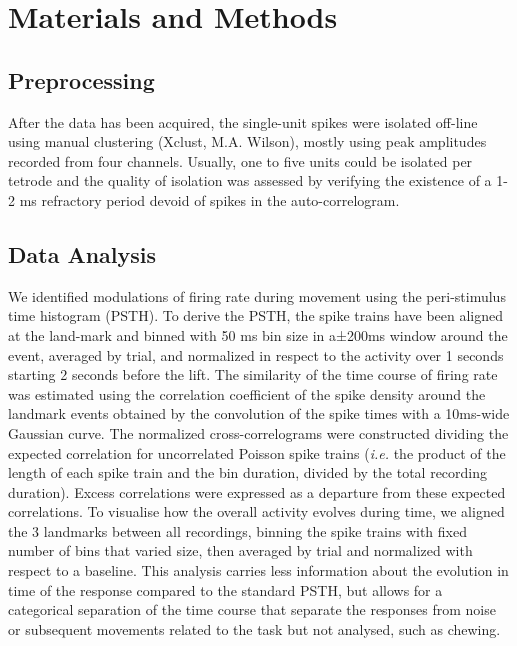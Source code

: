 \section{Materials and Methods}

\subsection{Preprocessing}
After the data has been acquired, the single-unit spikes were isolated off-line using manual clustering (Xclust, M.A. Wilson), mostly using peak amplitudes recorded from four channels. Usually, one to five units could be isolated per tetrode and the quality of isolation was assessed by verifying the existence of a 1-2 ms refractory period devoid of spikes in the auto-correlogram. 

\subsection{Data Analysis}
We identified modulations of firing rate during movement using the peri-stimulus time histogram (PSTH). To derive the PSTH, the spike trains have been aligned at the land-mark and binned with 50 ms bin size in a±200ms window around the event, averaged by trial, and normalized in respect to the activity over 1 seconds starting 2 seconds before the lift. The similarity of the time course of firing rate was estimated using the correlation coefficient of the spike density around the landmark events obtained by the convolution of the spike times with a 10ms-wide Gaussian curve. The normalized cross-correlograms were constructed dividing the expected correlation for uncorrelated Poisson spike trains (\emph{i.e.} the product of the length of each spike train and the bin duration, divided by the total recording duration). Excess correlations were expressed as a departure from these expected correlations.
To visualise how the overall activity evolves during time, we aligned the 3 landmarks between all recordings, binning the spike trains with fixed number of bins that varied size, then averaged by trial and normalized with respect to a baseline. This analysis carries less information about the evolution in time of the response compared to the standard PSTH, but allows for a categorical separation of the time course that separate the responses from noise or subsequent movements related to the task but not analysed, such as chewing.

